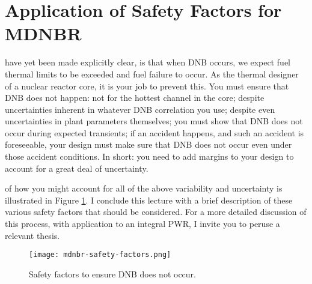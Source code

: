 \section{Application of Safety Factors for MDNBR}

 have yet been made explicitly clear, is that when DNB occurs, we expect fuel thermal limits to be exceeded and fuel failure to occur.  As the thermal designer of a nuclear reactor core, it is your job to prevent this.  You must ensure that DNB does not happen: not for the hottest channel in the core; despite uncertainties inherent in whatever DNB correlation you use; despite even uncertainties in plant parameters themselves; you must show that DNB does not occur during expected transients; if an accident happens, and such an accident is foreseeable, your design must make sure that DNB does not occur even under those accident conditions.  In short: you need to add margins to your design to account for a great deal of uncertainty.  

 of how you might account for all of the above variability and uncertainty is illustrated in Figure \ref{fig:mdnbr-safety-factors}.  I conclude this lecture with a brief description of these various safety factors that should be considered.  For a more detailed discussion of this process, with application to an integral PWR, I invite you to peruse a relevant thesis.\cite{blair2003thermal}

\begin{figure}
\texttt{[image: mdnbr-safety-factors.png]}
\caption{Safety factors to ensure DNB does not occur.} 
\label{fig:mdnbr-safety-factors}
\end{figure}

